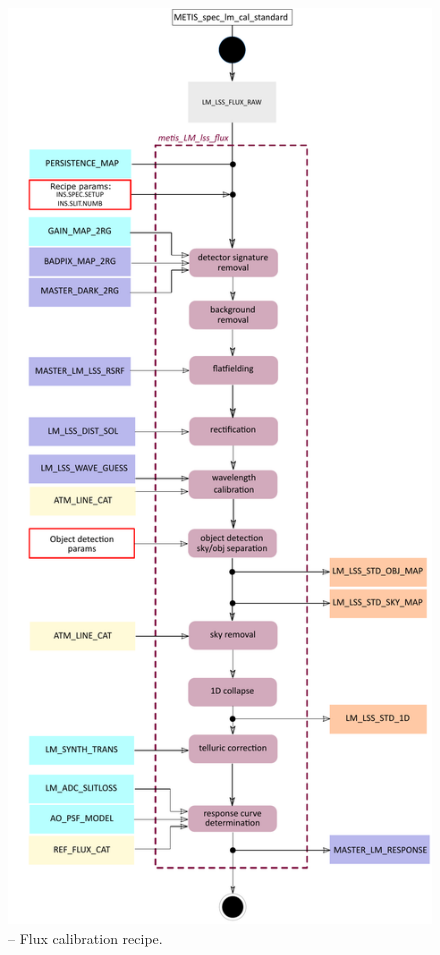 \begin{figure}[ht]
  \centering
  \includegraphics[width=0.4\textheight]{figures/metis_lm_lss_flux_v0.74.pdf}
  \caption[Recipe: ]{ --
    Flux calibration recipe.}
  \label{Fig:rec_lm_lss_flux}
\end{figure}
